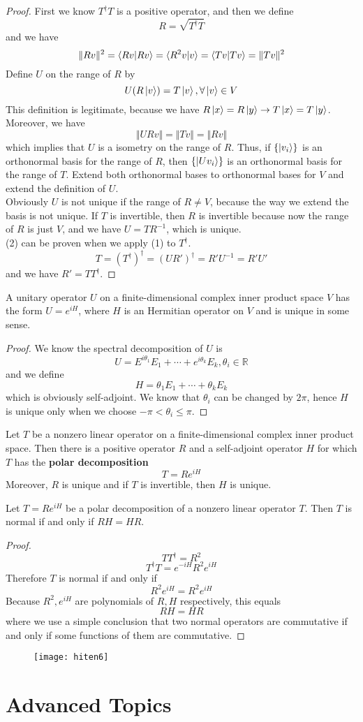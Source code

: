 \documentclass{article}
\begin{document}
\begin{proof}
	First we know $T^\dagger T$ is a positive operator, and then we define
	\[R=\sqrt{T^\dagger T}\]
	and we have
	\[\Vert Rv\Vert^2=\braket{Rv|Rv}=\braket{R^2v|v}=\braket{Tv|Tv}=\Vert Tv\Vert^2\]
	Define $U$ on the range of $R$ by
	\[U(R\ket{v})=T\ket{v},\forall\ket{v}\in V\]
	This definition is legitimate, because we have $R\ket{x}=R\ket{y}\rightarrow T\ket{x}=T\ket{y}$.\\
	Moreover, we have
	\[\Vert URv\Vert=\Vert Tv\Vert=\Vert Rv\Vert\]
	which implies that $U$ is a isometry on the range of $R$. Thus, if $\{\ket{v_i}\}$ is an orthonormal basis for the range of $R$, then $\{\ket{Uv_i}\}$ is an orthonormal basis for the range of $T$. Extend both orthonormal bases to orthonormal bases for $V$ and extend the definition of $U$.\\
	Obviously $U$ is not unique if the range of $R\neq V$, because the way we extend the basis is not unique. If $T$ is invertible, then $R$ is invertible because now the range of $R$ is just $V$, and we have $U=TR^{-1}$, which is unique.\\
	(2) can be proven when we apply (1) to $T^\dagger$.
	\[T=(T^\dagger)^\dagger=(UR')^\dagger=R'U^{-1}=R'U'\]
	and we have $R'=TT^\dagger$. 
\end{proof}
\begin{thm}
	A unitary operator $U$ on a finite-dimensional complex inner product space $V$ has the form $U=e^{iH}$, where $H$ is an Hermitian operator on $V$ and is unique in some sense.
\end{thm}
\begin{proof}
	We know the spectral decomposition of $U$ is
	\[U=E^{i\theta_1}E_1+\cdots+e^{i\theta_k}E_k,\theta_i\in\mathbb{R}\]
	and we define
	\[H=\theta_1E_1+\cdots+\theta_kE_k\]
	which is obviously self-adjoint. We know that $\theta_i$ can be changed by $2\pi$, hence $H$ is unique only when we choose $-\pi<\theta_i\le\pi$.
\end{proof}
\begin{thm}
	Let $T$ be a nonzero linear operator on a finite-dimensional complex inner product space. Then there is a positive operator $R$ and a self-adjoint operator $H$ for which $T$ has the \textbf{polar decomposition}
	\[T=Re^{iH}\]
	Moreover, $R$ is unique and if $T$ is invertible, then $H$ is unique.
\end{thm}
\begin{thm}
	Let $T=Re^{iH}$ be a polar decomposition of a nonzero linear operator $T$. Then $T$ is normal if and only if $RH=HR$.
\end{thm}
\begin{proof}
	\[TT^\dagger=R^2\]
	\[T^\dagger T=e^{-iH}R^2e^{iH}\]
	Therefore $T$ is normal if and only if 
	\[R^2e^{iH}=R^2e^{iH}\]
	Because $R^2,e^{iH}$ are polynomials of $R,H$ respectively, this equals
	\[RH=HR\]
	where we use a simple conclusion that two normal operators are commutative if and only if some functions of them are commutative.
\end{proof}
\newpage
\begin{figure}[H]
	\centering
	\texttt{[image: hiten6]}
\end{figure}
\newpage
\section{Advanced Topics}
\end{document}
